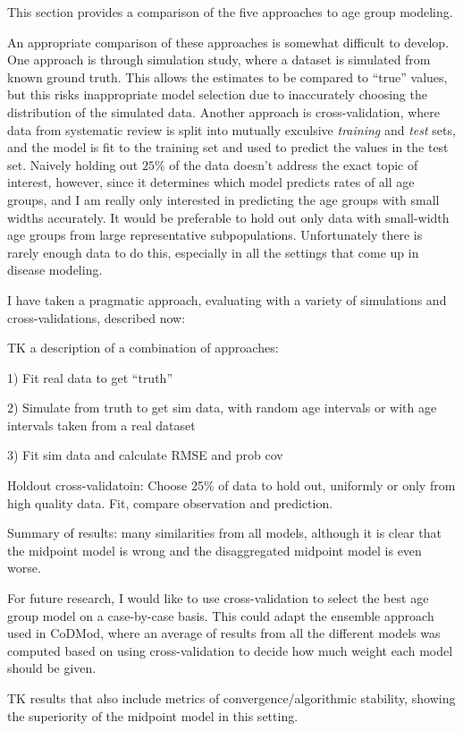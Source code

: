 This section provides a comparison of the five approaches to age group
modeling.

An appropriate comparison of these approaches is somewhat difficult to
develop.  One approach is through simulation study, where a dataset is
simulated from known ground truth.  This allows the estimates to be
compared to ``true'' values, but this risks
inappropriate model selection due to inaccurately choosing the
distribution of the simulated data.  Another approach is
cross-validation, where data from systematic review is split into
mutually exculsive
\emph{training} and \emph{test} sets, and the model is fit to the
training set and used to predict the values in the test set.  Naively
holding out $25\%$ of the data doesn't address the exact topic of
interest, however, since it determines which model predicts rates of
all age groups, and I am really only interested in predicting the age
groups with small widths accurately.  It would be preferable to hold
out only data with small-width age groups from large representative
subpopulations.  Unfortunately there is rarely enough data to do this,
especially in all the settings that come up in disease modeling.

I have taken a pragmatic approach, evaluating with a variety of
simulations and cross-validations, described now:

TK a description of a combination of approaches:

1) Fit real data to get ``truth''

2) Simulate from truth to get sim data, with random age intervals or with age intervals taken from a real dataset

3) Fit sim data and calculate RMSE and prob cov

Holdout cross-validatoin: Choose 25\% of data to hold out, uniformly
or only from high quality data.  Fit, compare observation and
prediction.

Summary of results: many similarities from all models, although it is
clear that the midpoint model is wrong and the disaggregated midpoint
model is even worse.

For future research, I would like to use cross-validation to select
the best age group model on a case-by-case basis.  This could adapt
the ensemble approach used in CoDMod, where an average of results from
all the different models was computed based on using cross-validation
to decide how much weight each model should be given.

TK results that also include metrics of convergence/algorithmic
stability, showing the superiority of the midpoint model in this
setting.
